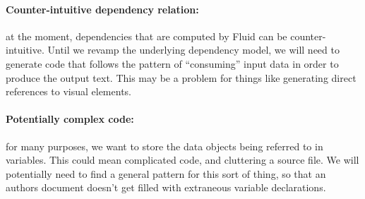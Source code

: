 \paragraph{Counter-intuitive dependency relation:} at the moment, dependencies that are computed by Fluid can be counter-intuitive.
Until we revamp the underlying dependency model, we will need to generate code that follows the pattern of ``consuming'' input
data in order to produce the output text. This may be a problem for things like generating direct references to visual elements.

\paragraph{Potentially complex code:} for many purposes, we want to store the data objects being referred to in variables. This 
could mean complicated code, and cluttering a source file. We will potentially need to find a general pattern for this sort of thing,
so that an authors document doesn't get filled with extraneous variable declarations. 